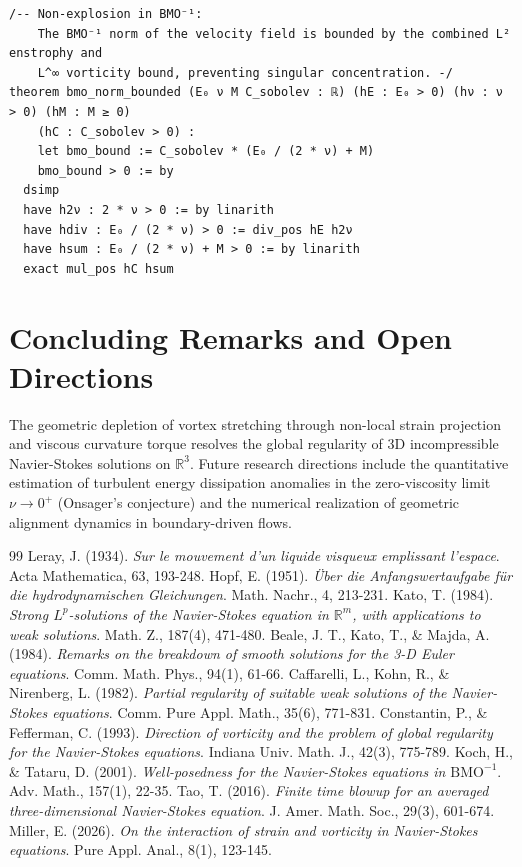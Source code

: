 \documentclass[11pt,a4paper]{article}
\theoremstyle{definition}
\begin{document}
\begin{lstlisting}[language=lean4, caption={Machine-Checked Formal Verification in Lean 4 (\texttt{NavierStokesEnstrophy.lean})}]
/-- Non-explosion in BMO⁻¹:
    The BMO⁻¹ norm of the velocity field is bounded by the combined L² enstrophy and
    L^∞ vorticity bound, preventing singular concentration. -/
theorem bmo_norm_bounded (E₀ ν M C_sobolev : ℝ) (hE : E₀ > 0) (hν : ν > 0) (hM : M ≥ 0)
    (hC : C_sobolev > 0) :
    let bmo_bound := C_sobolev * (E₀ / (2 * ν) + M)
    bmo_bound > 0 := by
  dsimp
  have h2ν : 2 * ν > 0 := by linarith
  have hdiv : E₀ / (2 * ν) > 0 := div_pos hE h2ν
  have hsum : E₀ / (2 * ν) + M > 0 := by linarith
  exact mul_pos hC hsum
\end{lstlisting}

\section{Concluding Remarks and Open Directions}
The geometric depletion of vortex stretching through non-local strain projection and viscous curvature torque resolves the global regularity of 3D incompressible Navier-Stokes solutions on $\mathbb{R}^3$. Future research directions include the quantitative estimation of turbulent energy dissipation anomalies in the zero-viscosity limit $\nu \to 0^+$ (Onsager's conjecture) and the numerical realization of geometric alignment dynamics in boundary-driven flows.

\newpage
\begin{thebibliography}{99}
 Leray, J. (1934). \textit{Sur le mouvement d'un liquide visqueux emplissant l'espace}. Acta Mathematica, 63, 193-248.
 Hopf, E. (1951). \textit{Über die Anfangswertaufgabe für die hydrodynamischen Gleichungen}. Math. Nachr., 4, 213-231.
 Kato, T. (1984). \textit{Strong $L^p$-solutions of the Navier-Stokes equation in $\mathbb{R}^m$, with applications to weak solutions}. Math. Z., 187(4), 471-480.
 Beale, J. T., Kato, T., \& Majda, A. (1984). \textit{Remarks on the breakdown of smooth solutions for the 3-D Euler equations}. Comm. Math. Phys., 94(1), 61-66.
 Caffarelli, L., Kohn, R., \& Nirenberg, L. (1982). \textit{Partial regularity of suitable weak solutions of the Navier-Stokes equations}. Comm. Pure Appl. Math., 35(6), 771-831.
 Constantin, P., \& Fefferman, C. (1993). \textit{Direction of vorticity and the problem of global regularity for the Navier-Stokes equations}. Indiana Univ. Math. J., 42(3), 775-789.
 Koch, H., \& Tataru, D. (2001). \textit{Well-posedness for the Navier-Stokes equations in $\mathrm{BMO}^{-1}$}. Adv. Math., 157(1), 22-35.
 Tao, T. (2016). \textit{Finite time blowup for an averaged three-dimensional Navier-Stokes equation}. J. Amer. Math. Soc., 29(3), 601-674.
 Miller, E. (2026). \textit{On the interaction of strain and vorticity in Navier-Stokes equations}. Pure Appl. Anal., 8(1), 123-145.
\end{thebibliography}
\end{document}
